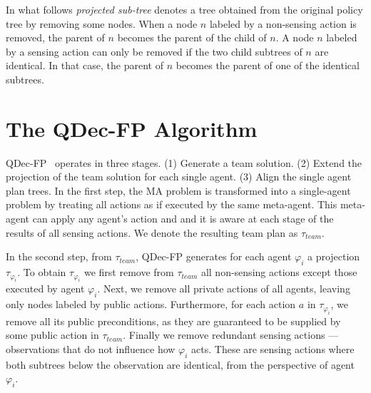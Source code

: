 \documentclass[letterpaper]{article} %
\theoremstyle{definition}
\begin{document}
In what follows  {\em projected sub-tree} denotes a tree  obtained from the original policy tree by removing some nodes. When a node $n$ labeled by a non-sensing action is removed, the parent of $n$ becomes the parent of the child of $n$. A node $n$ labeled by a sensing action can only be removed if the two child subtrees of $n$ are identical. In that case, the parent of $n$ becomes the parent of one of the identical subtrees.





\section{The QDec-FP Algorithm}

QDec-FP~\citep{ShekharBS19} operates in three stages. (1) Generate a team solution. (2) Extend the projection of the team solution for each single agent. (3) Align the single agent plan trees.
In the first step, the MA problem is transformed into a single-agent problem by treating all actions as if executed by the same meta-agent. This meta-agent can apply any agent's action and and it is aware at each stage of the results of all sensing actions. We denote the resulting team plan as $\tau_{team}$.

In the second step, from $\tau_{team}$, QDec-FP generates for each agent $\varphi_i$ a projection $\tau_{\varphi_i}$. To obtain $\tau_{\varphi_i}$ we first remove from $\tau_{team}$ all non-sensing actions except those executed by agent $\varphi_i$. Next, we remove all private actions of all agents, leaving only nodes labeled by public actions.
Furthermore, for each action $a$ in $\tau_{\varphi_i}$, we remove all its public preconditions, as they are guaranteed to be supplied by some public action in $\tau_{team}$.
Finally we remove redundant sensing actions --- observations that do not influence how $\varphi_i$ acts. These are sensing actions where both subtrees below the observation are identical, from the perspective of agent $\varphi_i$.
\end{document}
